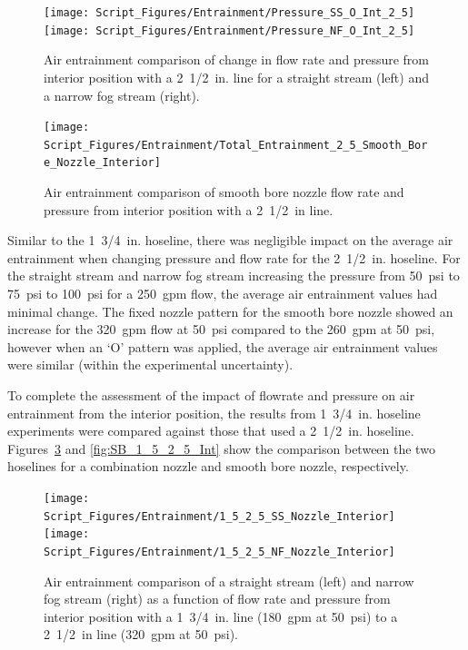 \documentclass[12pt,oneside]{book}
\begin{document}
\begin{figure}[!ht]
\centering
\texttt{[image: Script\_Figures/Entrainment/Pressure\_SS\_O\_Int\_2\_5]}
\texttt{[image: Script\_Figures/Entrainment/Pressure\_NF\_O\_Int\_2\_5]}
\caption[Air Entrainment Comparison of Pressure and Flow Rate for Interior Combination Nozzle from 2~1/2~in. Line]{Air entrainment comparison of change in flow rate and pressure from interior position with a 2~1/2~in. line for a straight stream (left) and a narrow fog stream (right).}
\label{fig:SS_NF_FlowRate_Int_2_5}
\end{figure}

\begin{figure}[!ht]
\centering
\texttt{[image: Script\_Figures/Entrainment/Total\_Entrainment\_2\_5\_Smooth\_Bore\_Nozzle\_Interior]}
\caption[Air Entrainment Comparison of Exterior Smooth Bore Nozzle from 2~1/2~in. Line]{Air entrainment comparison of smooth bore nozzle flow rate and pressure from interior position with a 2~1/2~in line.}
\label{fig:SB_Flowrate_Int_2_5}
\end{figure}

Similar to the 1~3/4~in. hoseline, there was negligible impact on the average air entrainment when changing pressure and flow rate for the 2~1/2~in. hoseline. For the straight stream and narrow fog stream increasing the pressure from 50~psi to 75~psi to 100~psi for a 250~gpm flow, the average air entrainment values had minimal change. The fixed nozzle pattern for the smooth bore nozzle showed an increase for the 320~gpm flow at 50~psi compared to the 260~gpm at 50~psi, however when an `O' pattern was applied, the average air entrainment values were similar (within the experimental uncertainty).

To complete the assessment of the impact of flowrate and pressure on air entrainment from the interior position, the results from 1~3/4~in. hoseline experiments were compared against those that used a 2~1/2~in. hoseline. Figures~\ref{fig:SS_NF_1_5_2_5_Int} and \ref{fig:SB_1_5_2_5_Int} show the comparison between the two hoselines for a combination nozzle and smooth bore nozzle, respectively.

\begin{figure}[!ht]
\centering
\texttt{[image: Script\_Figures/Entrainment/1\_5\_2\_5\_SS\_Nozzle\_Interior]}
\texttt{[image: Script\_Figures/Entrainment/1\_5\_2\_5\_NF\_Nozzle\_Interior]}
\caption[Air Entrainment Comparison of Interior Smooth Bore Nozzle from 1~3/4~in Line to 2~1/2~in. Line]{Air entrainment comparison of a straight stream (left) and narrow fog stream (right) as a function of flow rate and pressure from interior position with a 1~3/4~in. line (180~gpm at 50~psi) to a 2~1/2~in line (320~gpm at 50~psi).}
\label{fig:SS_NF_1_5_2_5_Int}
\end{figure}
\end{document}

